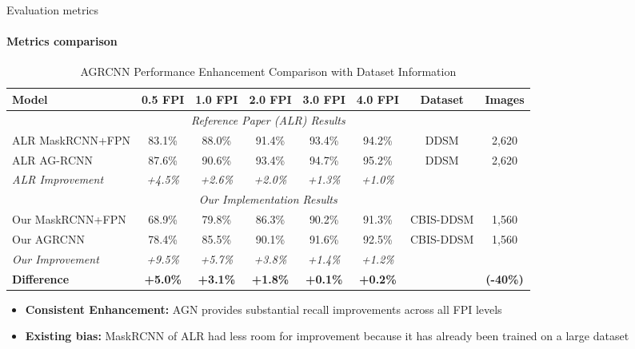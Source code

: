 \documentclass[8pt,aspectratio=169,xcolor=dvipsnames]{beamer}
\begin{document}
\begin{frame}{Evaluation metrics}
\framesubtitle{Metrics comparison}
\begin{table}[H]
\centering
\footnotesize
\begin{tabular}{lccccccc}
\toprule
\textbf{Model} & \textbf{0.5 FPI} & \textbf{1.0 FPI} & \textbf{2.0 FPI} & \textbf{3.0 FPI} & \textbf{4.0 FPI} & \textbf{Dataset} & \textbf{Images}\\
\midrule
\multicolumn{8}{c}{\textit{Reference Paper (ALR) Results}} \\
\midrule
ALR MaskRCNN+FPN & 83.1\% & 88.0\% & 91.4\% & 93.4\% & 94.2\% & DDSM & 2,620 \\
ALR AG-RCNN & 87.6\% & 90.6\% & 93.4\% & 94.7\% & 95.2\% & DDSM & 2,620 \\
\textit{ALR Improvement} & \textit{+4.5\%} & \textit{+2.6\%} & \textit{+2.0\%} & \textit{+1.3\%} & \textit{+1.0\%} & & \\
\midrule
\multicolumn{8}{c}{\textit{Our Implementation Results}} \\
\midrule
Our MaskRCNN+FPN & 68.9\% & 79.8\% & 86.3\% & 90.2\% & 91.3\% & CBIS-DDSM & 1,560 \\
Our AGRCNN & 78.4\% & 85.5\% & 90.1\% & 91.6\% & 92.5\% & CBIS-DDSM & 1,560 \\
\textit{Our Improvement} & \textit{+9.5\%} & \textit{+5.7\%} & \textit{+3.8\%} & \textit{+1.4\%} & \textit{+1.2\%} & & \\
\midrule
\textbf{Difference} & \textbf{+5.0\%} & \textbf{+3.1\%} & \textbf{+1.8\%} & \textbf{+0.1\%} & \textbf{+0.2\%} & & \textbf{(-40\%)} \\
\bottomrule
\end{tabular}
\caption{AGRCNN Performance Enhancement Comparison with Dataset Information}
\end{table}
\begin{itemize}
    \item \textbf{Consistent Enhancement:} AGN provides substantial recall improvements across all FPI levels
    \item \textbf{Existing bias:} MaskRCNN of ALR had less room for improvement because it has already been trained on a large dataset
\end{itemize}
\end{frame}
\end{document}

